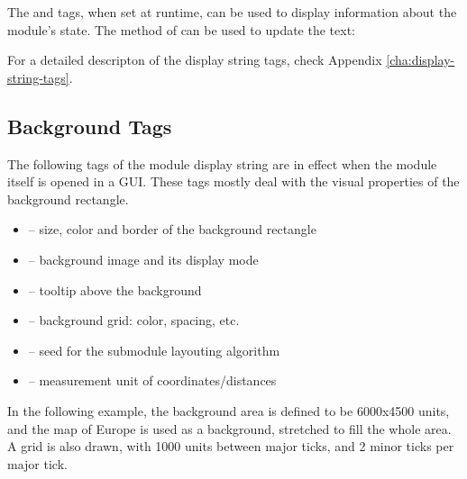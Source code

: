 \begin{note}
  The  and  tags, when set at runtime, can be used to display
  information about the module's state. The  method
  of  can be used to update the text:
\end{note}

For a detailed descripton of the display string tags, check
Appendix \ref{cha:display-string-tags}.


\subsection{Background Tags}

The following tags of the module display string are in effect when the
module itself is opened in a GUI. These tags mostly deal with the visual
properties of the background rectangle.

\begin{itemize}
  \item {} -- size, color and border of the background rectangle
  \item {} -- background image and its display mode
  \item {} -- tooltip above the background
  \item {} -- background grid: color, spacing, etc.
  \item {} -- seed for the submodule layouting algorithm
  \item {} -- measurement unit of coordinates/distances
\end{itemize}

In the following example, the background area is defined to be 6000x4500
units, and the map of Europe is used as a background, stretched to fill the
whole area. A grid is also drawn, with 1000 units between major ticks,
and 2 minor ticks per major tick.

\begin{ned}
network EuropePlayground
{
    @display("bgb=6000,4500;bgi=maps/europe,s;bgg=1000,2,grey95;bgu=km");
\end{ned}

